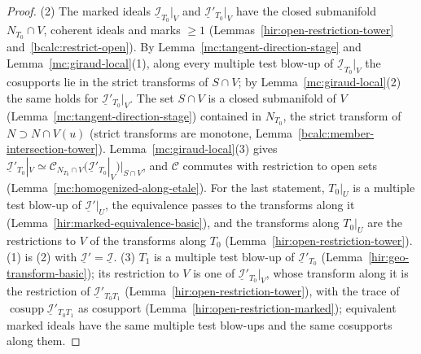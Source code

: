 \begin{proof}
\leanok
(2) The marked ideals \(\underline{\mathcal I}_{T_0}|_V\) and \(\underline{\mathcal I}'_{T_0}|_V\) have the closed submanifold \(N_{T_0}\cap V\), coherent ideals and marks \(\ge1\)
(Lemmas~\ref{hir:open-restriction-tower} and~\ref{bcalc:restrict-open}). By Lemma~\ref{mc:tangent-direction-stage} and Lemma~\ref{mc:giraud-local}(1), along every multiple test
blow-up of \(\underline{\mathcal I}_{T_0}|_V\) the cosupports lie in the strict transforms of \(S\cap V\); by Lemma~\ref{mc:giraud-local}(2) the same holds for
\(\underline{\mathcal I}'_{T_0}|_V\). The set \(S\cap V\) is a closed submanifold of \(V\) (Lemma~\ref{mc:tangent-direction-stage}) contained in \(N_{T_0}\), the strict transform of
\(N\supset N\cap V(u)\) (strict transforms are monotone, Lemma~\ref{bcalc:member-intersection-tower}). Lemma~\ref{mc:giraud-local}(3) gives
\(\underline{\mathcal I}'_{T_0}|_V\simeq\mathcal C_{N_{T_0}\cap V}(\underline{\mathcal I}'_{T_0}|_V)|_{S\cap V}\), and \(\mathcal C\) commutes with restriction to open sets
(Lemma~\ref{mc:homogenized-along-etale}). For the last statement, \(T_0|_U\) is a multiple test blow-up of \(\underline{\mathcal I}'|_U\), the equivalence passes to the
transforms along it (Lemma~\ref{hir:marked-equivalence-basic}), and the transforms along \(T_0|_U\) are the restrictions to \(V\) of the transforms along \(T_0\)
(Lemma~\ref{hir:open-restriction-tower}). (1) is (2) with \(\underline{\mathcal I}'=\underline{\mathcal I}\). (3) \(T_1\) is a multiple test blow-up of
\(\underline{\mathcal I}'_{T_0}\) (Lemma~\ref{hir:geo-transform-basic}); its restriction to \(V\) is one of \(\underline{\mathcal I}'_{T_0}|_V\), whose transform along it is the restriction
of \(\underline{\mathcal I}'_{T_0T_1}\) (Lemma~\ref{hir:open-restriction-tower}), with the trace of \(\operatorname{cosupp}\underline{\mathcal I}'_{T_0T_1}\) as cosupport
(Lemma~\ref{hir:open-restriction-marked}); equivalent marked ideals have the same multiple test blow-ups and the same cosupports along them.
\end{proof}

